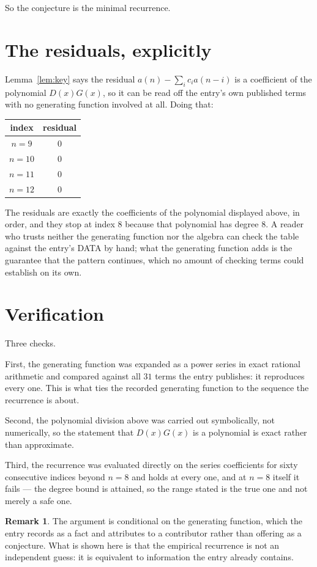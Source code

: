 \documentclass[11pt,a4paper]{article}
\theoremstyle{plain}
\theoremstyle{definition}
\newtheorem{remark}[theorem]{Remark}
\begin{document}
So the conjecture is the minimal recurrence.

\section{The residuals, explicitly}

Lemma~\ref{lem:key} says the residual $a(n)-\sum_ic_ia(n-i)$ is a coefficient of the
polynomial $D(x)G(x)$, so it can be read off the entry's own published terms with no
generating function involved at all. Doing that:
\begin{center}
\begin{tabular}{cc}
index & residual \\ \hline
$n=9$ & $0$ \\
$n=10$ & $0$ \\
$n=11$ & $0$ \\
$n=12$ & $0$
\end{tabular}
\end{center}
The residuals are exactly the coefficients of the polynomial displayed above, in order, and
they stop at index $8$ because that polynomial has degree $8$. A reader who trusts
neither the generating function nor the algebra can check the table against the entry's DATA
by hand; what the generating function adds is the guarantee that the pattern continues, which
no amount of checking terms could establish on its own.

\section{Verification}

Three checks.

First, the generating function was expanded as a power series in exact rational arithmetic and
compared against all $31$ terms the entry publishes: it reproduces every one. This is
what ties the recorded generating function to the sequence the recurrence is about.

Second, the polynomial division above was carried out symbolically, not numerically, so the
statement that $D(x)G(x)$ is a polynomial is exact rather than approximate.

Third, the recurrence was evaluated directly on the series coefficients for sixty consecutive
indices beyond $n=8$ and holds at every one, and at $n=8$ itself it fails --- the
degree bound is attained, so the range stated is the true one and not merely a safe one.

\begin{remark}
The argument is conditional on the generating function, which the entry records as a fact and
attributes to a contributor rather than offering as a conjecture. What is shown here is that
the empirical recurrence is not an independent guess: it is equivalent to information the
entry already contains.
\end{remark}
\end{document}
